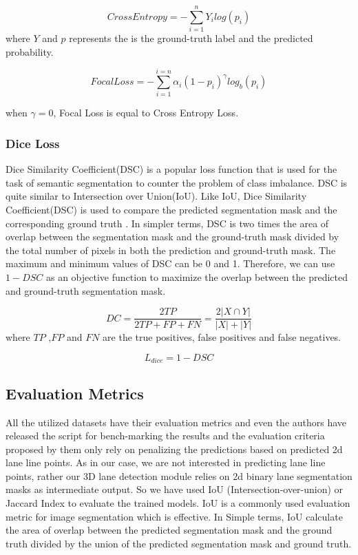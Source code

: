         
        \begin{equation}
            Cross Entropy = - \sum^{n}_{i=1}Y_{i}log(p_{i})
        \end{equation}
        where $Y$ and $p$ represents the is the ground-truth label and the predicted probability.
        
        \begin{equation}
            Focal Loss = - \sum^{i=n}_{i=1} \alpha_{i}(1-p_{i})^{\gamma} log_{b}(p_{i})
        \end{equation}
        
         when $\gamma = 0$, Focal Loss is equal to Cross Entropy Loss. 
        
        \subsubsection{Dice Loss}
         Dice Similarity Coefficient(DSC) is a popular loss function that is used for the task of semantic segmentation to counter the problem of class imbalance. DSC is quite similar to Intersection over Union(IoU). Like IoU, Dice Similarity Coefficient(DSC) is used to compare the predicted segmentation mask and the corresponding ground truth \cite{dsc}. In simpler terms, DSC is two times the \cite{dsc} area of overlap between the segmentation mask and the ground-truth mask divided by the total number of pixels in both the prediction and ground-truth mask. The maximum and minimum values of DSC can be 0 and 1. Therefore, we can use $1- DSC$ as an objective function to maximize the overlap between the predicted and ground-truth segmentation mask.  
        
        \begin{equation}
            DC = \frac{2TP}{2TP + FP + FN} = \frac{2|X \cap Y|}{|X| + |Y|}
        \end{equation}
    where $TP$ ,$FP$ and $FN$ are the true positives, false positives and false negatives.  
        
        \begin{equation}
            L_{dice} = 1 - DSC
        \end{equation}
         
        
        \subsection{Evaluation Metrics}
        All the utilized datasets have their evaluation metrics and even the authors have released the script for bench-marking the results and the evaluation criteria proposed by them only rely on penalizing the predictions based on predicted 2d lane line points. As in our case, we are not interested in predicting lane line points, rather our 3D lane detection module relies on 2d binary lane segmentation masks as intermediate output. So we have used IoU (Intersection-over-union) or Jaccard Index to evaluate the trained models. IoU is a commonly used evaluation metric for image segmentation which is effective. In Simple terms, IoU calculate the area of overlap between the predicted segmentation mask and the ground truth divided by the union of the predicted segmentation mask and ground truth.
        
